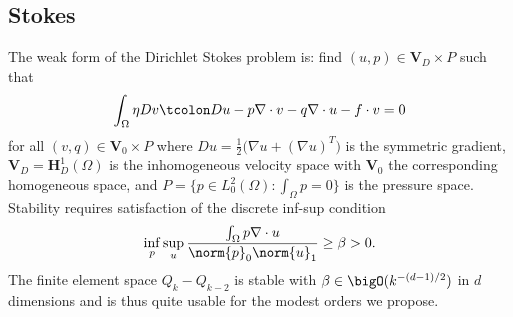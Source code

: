 \subsection{Stokes}
The weak form of the Dirichlet Stokes problem is: find $(u,p) \in \bm V_D \times P$ such that
\begin{equation*}
  \int_\Omega \eta Dv \tcolon Du - p \nabla\cdot v - q\nabla\cdot u - f\cdot v = 0
\end{equation*}
for all $(v,q) \in \bm V_0 \times P$ where $Du = \frac 1 2 \big(\nabla u + (\nabla u)^T \big)$ is the symmetric
gradient, $\bm V_D = \bm H^1_D(\Omega)$ is the inhomogeneous velocity space with $\bm V_0$ the corresponding homogeneous
space, and $P = \{p \in L^2_0(\Omega) : \int_\Omega p = 0 \}$ is the pressure space.  Stability requires satisfaction of
the discrete inf-sup condition
\begin{equation*}
  \inf_{p} \sup_{u} \frac{\int_\Omega p \nabla \cdot u}{\norm{p}_{0} \norm{u}_1} \ge \beta > 0 .
\end{equation*}
The finite element space $Q_k-Q_{k-2}$ is stable with $\beta \in \bigO(k^{-(d-1)/2})$ in $d$ dimensions \citep[see][]{schotzau1998mhf} and is thus quite usable for the modest orders we propose.


